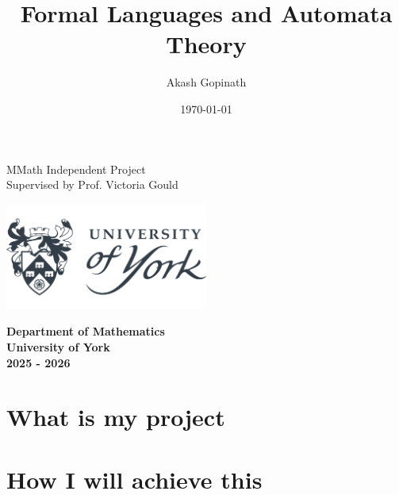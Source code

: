 \documentclass[11pt]{report}
\title{\Huge\textbf{Formal Languages and Automata Theory}}
\author{\large Akash Gopinath}
\date{\today}
\begin{document}
{
\let\newpage\relax
\maketitle
\begin{center}
	\vfill
	\Large
	MMath Independent Project \\
	Supervised by Prof. Victoria Gould

	\vspace{0.4cm}
	\includegraphics[width=0.5\textwidth]{university.png}

	\textbf{
		Department of Mathematics \\
		University of York \\
		2025 - 2026	}
\end{center}
}
\titlepage

\pagestyle{fancy}


\tableofcontents
\newpage


%

\chapter{What is my project}

\newpage

%

\chapter{How I will achieve this}

\newpage
\end{document}
